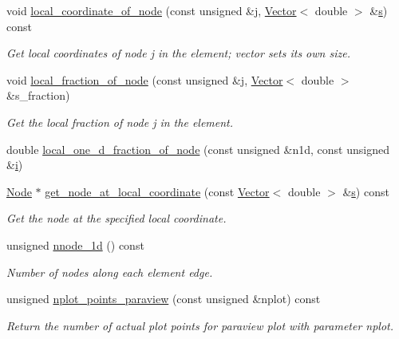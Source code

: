 \begin{DoxyCompactItemize}
void \hyperlink{classoomph_1_1QElement_3_012_00_01NNODE__1D_01_4_ab5718b72ff86f466b6af73cf9cc69559}{local\+\_\+coordinate\+\_\+of\+\_\+node} (const unsigned \&j, \hyperlink{classoomph_1_1Vector}{Vector}$<$ double $>$ \&\hyperlink{cfortran_8h_ab7123126e4885ef647dd9c6e3807a21c}{s}) const
\begin{DoxyCompactList}\small\item\em Get local coordinates of node j in the element; vector sets its own size. \end{DoxyCompactList}\item 
void \hyperlink{classoomph_1_1QElement_3_012_00_01NNODE__1D_01_4_a7d209a0fae3273f7e948f508da5b32f4}{local\+\_\+fraction\+\_\+of\+\_\+node} (const unsigned \&j, \hyperlink{classoomph_1_1Vector}{Vector}$<$ double $>$ \&s\+\_\+fraction)
\begin{DoxyCompactList}\small\item\em Get the local fraction of node j in the element. \end{DoxyCompactList}\item 
double \hyperlink{classoomph_1_1QElement_3_012_00_01NNODE__1D_01_4_ac8424febdb220d33fbe07ff30bc882db}{local\+\_\+one\+\_\+d\+\_\+fraction\+\_\+of\+\_\+node} (const unsigned \&n1d, const unsigned \&\hyperlink{cfortran_8h_adb50e893b86b3e55e751a42eab3cba82}{i})
\item 
\hyperlink{classoomph_1_1Node}{Node} $\ast$ \hyperlink{classoomph_1_1QElement_3_012_00_01NNODE__1D_01_4_ac001c0655ddfb205069e1541d10f59b1}{get\+\_\+node\+\_\+at\+\_\+local\+\_\+coordinate} (const \hyperlink{classoomph_1_1Vector}{Vector}$<$ double $>$ \&\hyperlink{cfortran_8h_ab7123126e4885ef647dd9c6e3807a21c}{s}) const
\begin{DoxyCompactList}\small\item\em Get the node at the specified local coordinate. \end{DoxyCompactList}\item 
unsigned \hyperlink{classoomph_1_1QElement_3_012_00_01NNODE__1D_01_4_a8654dd65f19c1b47a3361e55b92df34d}{nnode\+\_\+1d} () const
\begin{DoxyCompactList}\small\item\em Number of nodes along each element edge. \end{DoxyCompactList}\item 
unsigned \hyperlink{classoomph_1_1QElement_3_012_00_01NNODE__1D_01_4_a8b0697ca30704a6f0a64f1a0b744f587}{nplot\+\_\+points\+\_\+paraview} (const unsigned \&nplot) const
\begin{DoxyCompactList}\small\item\em Return the number of actual plot points for paraview plot with parameter nplot. \end{DoxyCompactList}\item 

\end{DoxyCompactItemize}
